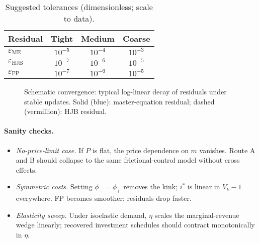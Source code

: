 ﻿\documentclass[11pt,letterpaper,oneside]{article}
\numberwithin{equation}{section}
\newcommand{\1}{\mathbf{1}}
\begin{document}
\begin{table}[ht]
\centering
\small
\begin{tabular}{@{}lccc@{}}
\toprule
Residual & Tight & Medium & Coarse \\
\midrule
$\varepsilon_{\mathrm{ME}}$ & $10^{-5}$ & $10^{-4}$ & $10^{-3}$ \\
$\varepsilon_{\mathrm{HJB}}$ & $10^{-7}$ & $10^{-6}$ & $10^{-5}$ \\
$\varepsilon_{\mathrm{FP}}$  & $10^{-7}$ & $10^{-6}$ & $10^{-5}$ \\
\bottomrule
\end{tabular}
\caption{Suggested tolerances (dimensionless; scale to data).}
\end{table}

\begin{figure}[ht]
\centering
{}
\caption{Schematic convergence: typical log-linear decay of residuals under stable updates. Solid (blue): master-equation residual; dashed (vermillion): HJB residual.}
\end{figure}

\paragraph{Sanity checks.}
\begin{itemize}[leftmargin=1.25em]
\item \emph{No-price-limit case.} If $P$ is flat, the price dependence on $m$ vanishes. Route A and B should collapse to the same frictional-control model without cross effects.
\item \emph{Symmetric costs.} Setting $\phi_-=\phi_+$ removes the kink; $i^*$ is linear in $V_k-1$ everywhere. FP becomes smoother; residuals drop faster.
\item \emph{Elasticity sweep.} Under isoelastic demand, $\eta$ scales the marginal-revenue wedge linearly; recovered investment schedules should contract monotonically in $\eta$.
\end{itemize}
\end{document}
